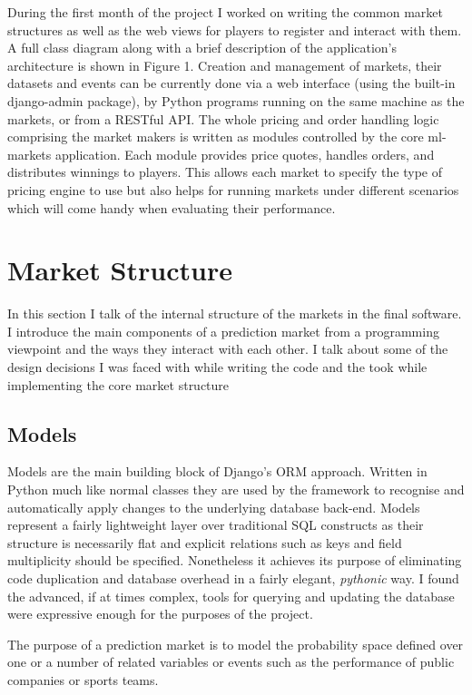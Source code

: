 \documentclass[bsc,frontabs,twoside,singlespacing,parskip,deptreport]{infthesis}     %
\begin{document}
	
	During the first month of the project I worked on writing the common market structures as well as the web views for players to register and interact with them. A full class diagram along with a brief description of the application’s architecture is shown in Figure 1. Creation and management of markets, their datasets and events can be currently done via a web interface (using the built-in django-admin package), by Python programs running on the same machine as the markets, or from a RESTful API.
The whole pricing and order handling logic comprising the market makers is written as modules controlled by the core ml-markets application. Each module provides price quotes, handles orders, and distributes winnings to players. This allows each market to specify the type of pricing engine to use but also helps for running markets under different scenarios which will come handy when evaluating their performance.  

\section{Market Structure}
In this section I talk of the internal structure of the markets in the final software. I introduce the main components of a prediction market from a programming viewpoint and the ways they interact with each other. I talk about some of the design decisions I was faced with while writing the code and the took while implementing the core market structure

\subsection{Models}
    Models are the main building block of Django's ORM approach. Written in Python much like normal classes they are used by the framework to recognise and automatically apply changes to the underlying database back-end. Models represent a fairly lightweight layer over traditional SQL constructs as their structure is necessarily flat and explicit relations such as keys and field multiplicity should be specified. Nonetheless it achieves its purpose of eliminating code duplication and database overhead in a fairly elegant, {\em pythonic} way. I found the advanced, if at times complex, tools for querying and updating the database were expressive enough for the purposes of the project. 

    The purpose of a prediction market is to model the probability space defined over one or a number of related variables or events such as the performance of public companies or sports teams. 
    
\end{document}
